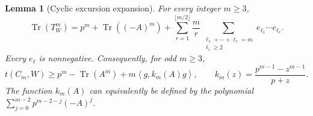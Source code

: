 \documentclass[11pt]{article}
\numberwithin{equation}{section}
\newtheorem{lemma}[theorem]{Lemma}
\newcommand{\Tr}{\operatorname{Tr}}
\newcommand{\ip}[2]{\left\langle #1,#2\right\rangle}
\begin{document}
\begin{lemma}[Cyclic excursion expansion]\label{lem:exc}
For every integer $m\ge3$,
\begin{equation}\label{eq:exactexc}
 \Tr(T_W^m)=p^m+\Tr((-A)^m)
 +\sum_{r=1}^{\lfloor m/2\rfloor}\frac mr
 \sum_{\substack{\ell_1+\cdots+\ell_r=m\\\ell_i\ge2}}
 e_{\ell_1}\cdots e_{\ell_r}.
\end{equation}
Every $e_\ell$ is nonnegative. Consequently, for odd $m\ge3$,
\begin{equation}\label{eq:oneexc}
 t(C_m,W)\ge p^m-\Tr(A^m)+m\ip{g}{k_m(A)g},
 \qquad k_m(z)=\frac{p^{m-1}-z^{m-1}}{p+z}.
\end{equation}
The function $k_m(A)$ can equivalently be defined by the polynomial
$\sum_{j=0}^{m-2}p^{m-2-j}(-A)^j$.
\end{lemma}
\end{document}
